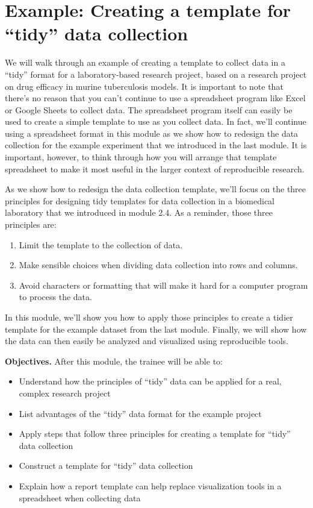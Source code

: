\documentclass[]{tufte-book}
\providecommand{\tightlist}{%
  \setlength{\itemsep}{0pt}\setlength{\parskip}{0pt}}
\begin{document}
\section{Example: Creating a template for ``tidy'' data collection}\label{module5}

We will walk through an example of creating a template to collect data in a
``tidy'' format for a laboratory-based research project, based on a research
project on drug efficacy in murine tuberculosis models. It is important to note
that there's no reason that you can't continue to use a spreadsheet program like
Excel or Google Sheets to collect data. The spreadsheet program itself can
easily be used to create a simple template to use as you collect data. In fact,
we'll continue using a spreadsheet format in this module as we show how to
redesign the data collection for the example experiment that we introduced in
the last module. It is important, however, to think through how you will arrange
that template spreadsheet to make it most useful in the larger context of
reproducible research.

As we show how to redesign the data collection template, we'll focus on the
three principles for designing tidy templates for data collection in a
biomedical laboratory that we introduced in module 2.4. As a reminder, those
three principles are:

\begin{enumerate}
\def\labelenumi{\arabic{enumi}.}
\tightlist
\item
  Limit the template to the collection of data.
\item
  Make sensible choices when dividing data collection into rows and columns.
\item
  Avoid characters or formatting that will make it hard for a computer program
  to process the data.
\end{enumerate}

In this module, we'll show you how to apply those principles to create a tidier
template for the example dataset from the last module. Finally, we will show how
the data can then easily be analyzed and visualized using reproducible tools.

\textbf{Objectives.} After this module, the trainee will be able to:

\begin{itemize}
\tightlist
\item
  Understand how the principles of ``tidy'' data can be applied for a real, complex research project
\item
  List advantages of the ``tidy'' data format for the example project
\item
  Apply steps that follow three principles for creating a template for ``tidy''
  data collection
\item
  Construct a template for ``tidy'' data collection
\item
  Explain how a report template can help replace visualization tools in a
  spreadsheet when collecting data
\end{itemize}
\end{document}
